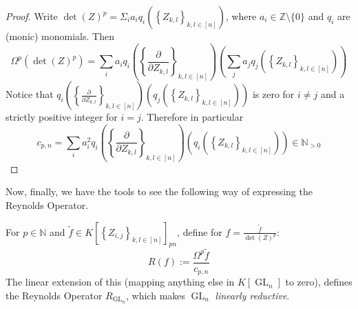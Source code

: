 \begin{proof}
  Write $ \operatorname{det} (Z)^p = \Sigma_i a_i q_i \left( \left\{ Z_{k,l} \right\}_{k,l \in [ n ]} \right) $, where $a_i \in \mathbb{Z} \setminus \{0\}$ and $q_i$ are (monic) monomials.
  Then
  \begin{equation}
    \Omega^p \left( \operatorname{det} (Z)^p \right)
    = \sum_i a_i q_i \left( \left\{ \frac{\partial}{\partial Z_{k,l}} \right\}_{k,l \in [ n ]} \right) \left( \sum_j a_j q_j \left( \left\{ Z_{k,l} \right\}_{k,l \in [ n ]} \right) \right)
  \end{equation}
  Notice that $ q_i \left( \left\{ \frac{\partial}{\partial Z_{k,l}} \right\}_{k,l \in [ n ]} \right) \left( q_j \left( \left\{ Z_{k,l} \right\}_{k,l \in [ n ]} \right) \right) $ is zero for $ i \neq j $ and a strictly positive integer for $ i = j $.
  Therefore in particular
  \begin{equation}
    c_{p,n}
    = \sum_i a_i^2 q_i \left( \left\{ \frac{\partial}{\partial Z_{k,l}} \right\}_{k,l \in [ n ]} \right) \left( q_i \left( \left\{ Z_{k,l} \right\}_{k,l \in [ n ]} \right) \right) \in \mathbb{N}_{>0}
  \end{equation}
\end{proof}
Now, finally, we have the tools to see the following way of expressing the Reynolds Operator.
\begin{theorem}
  For $ p \in \mathbb{N} $ and $ \tilde{f} \in K \left\lbrack \left\{ Z_{i,j} \right\}_{k,l \in [ n ]} \right\rbrack_{pn} $, define for $ f = \frac{\tilde{f}}{\operatorname{det}(Z)^p}$:
  \begin{equation}
    R \left( f \right) := \frac{\Omega^p \tilde{f}}{c_{p,n}}
  \end{equation}
  The linear extension of this (mapping anything else in $K \left\lbrack \operatorname{GL}_n \right\rbrack$ to zero), defines the Reynolds Operator $R_{\operatorname{GL}_n}$, which makes $\operatorname{GL}_n$ \textit{linearly reductive}.
\end{theorem}

